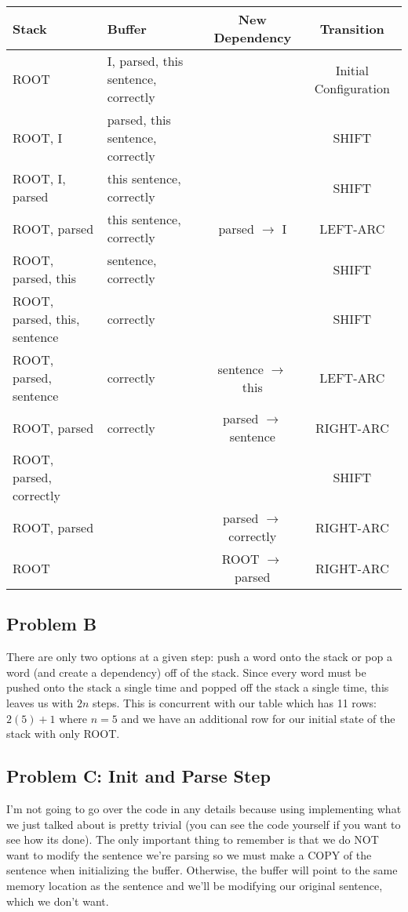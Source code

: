 \documentclass[12pt]{article}
\begin{document}
\bigskip
\scriptsize
\addtolength{\tabcolsep}{-1pt}
\begin{tabular}{l|l|c|c}
    Stack & Buffer & New Dependency & Transition \\
    \hline
    ROOT & I, parsed, this sentence, correctly && Initial Configuration \\
    ROOT, I & parsed, this sentence, correctly && SHIFT \\
    ROOT, I, parsed & this sentence, correctly && SHIFT \\
    ROOT, parsed & this sentence, correctly & parsed $\rightarrow$ I & LEFT-ARC \\
    ROOT, parsed, this & sentence, correctly  && SHIFT \\
    ROOT, parsed, this, sentence & correctly && SHIFT \\
    ROOT, parsed, sentence & correctly & sentence $\rightarrow$ this & LEFT-ARC \\
    ROOT, parsed & correctly & parsed $\rightarrow$ sentence & RIGHT-ARC \\
    ROOT, parsed, correctly &&& SHIFT \\
    ROOT, parsed && parsed $\rightarrow$ correctly & RIGHT-ARC \\
    ROOT && ROOT $\rightarrow$ parsed & RIGHT-ARC \\
\end{tabular}

\normalsize
\subsection{Problem B}
There are only two options at a given step: push a word onto the stack or pop 
a word (and create a dependency) off of the stack. Since every word must be 
pushed onto the stack a single time and popped off the stack a single time, 
this leaves us with $2n$ steps. This is concurrent with our table which has 
11 rows: $2(5) + 1$ where $n = 5$ and we have an additional row for our 
initial state of the stack with only ROOT. 

\subsection{Problem C: Init and Parse Step}
I'm not going to go over the code in any details because using implementing 
what we just talked about is pretty trivial (you can see the code yourself 
if you want to see how its done). The only important thing to remember is 
that we do NOT want to modify the sentence we're parsing so we must make 
a COPY of the sentence when initializing the buffer. Otherwise, the buffer 
will point to the same memory location as the sentence and we'll be modifying 
our original sentence, which we don't want. 

\subsection{}
\end{document}
